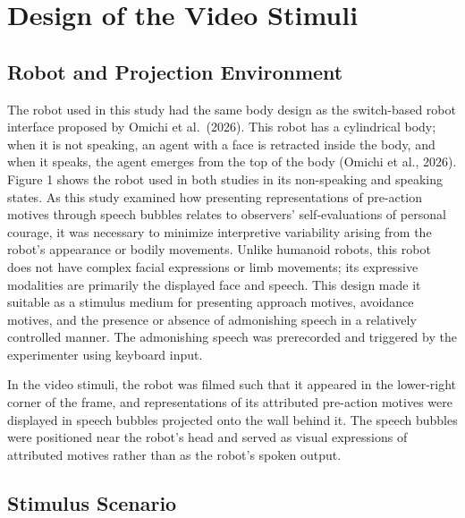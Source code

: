 \documentclass[utf8]{FrontiersinHarvard}
\begin{document}
\section{Design of the Video Stimuli}\label{design-of-the-video-stimuli}

\subsection{Robot and Projection Environment}\label{robot-and-projection-environment}

The robot used in this study had the same body design as the switch-based robot interface proposed by Omichi et al.~(2026). This robot has a cylindrical body; when it is not speaking, an agent with a face is retracted inside the body, and when it speaks, the agent emerges from the top of the body (Omichi et al., 2026). Figure 1 shows the robot used in both studies in its non-speaking and speaking states. As this study examined how presenting representations of pre-action motives through speech bubbles relates to observers' self-evaluations of personal courage, it was necessary to minimize interpretive variability arising from the robot's appearance or bodily movements. Unlike humanoid robots, this robot does not have complex facial expressions or limb movements; its expressive modalities are primarily the displayed face and speech. This design made it suitable as a stimulus medium for presenting approach motives, avoidance motives, and the presence or absence of admonishing speech in a relatively controlled manner. The admonishing speech was prerecorded and triggered by the experimenter using keyboard input.

In the video stimuli, the robot was filmed such that it appeared in the lower-right corner of the frame, and representations of its attributed pre-action motives were displayed in speech bubbles projected onto the wall behind it. The speech bubbles were positioned near the robot's head and served as visual expressions of attributed motives rather than as the robot's spoken output.

\subsection{Stimulus Scenario}\label{stimulus-scenario}
\end{document}
